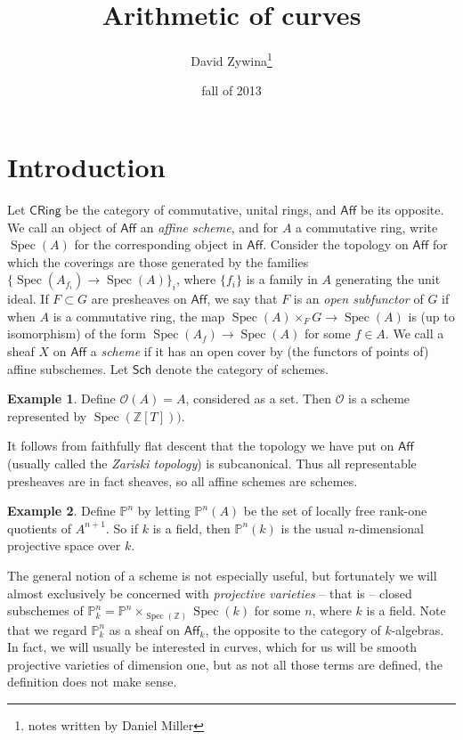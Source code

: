 \documentclass{article}
\title{Arithmetic of curves}
\author{David Zywina\thanks{notes written by Daniel Miller}}
\date{fall of 2013}
\DeclareMathOperator{\spec}{Spec}
\theoremstyle{definition}
\newtheorem{example}{Example}
\begin{document}
\maketitle










\section{Introduction}





Let $\mathsf{CRing}$ be the category of commutative, unital rings, and 
$\mathsf{Aff}$ be its opposite. We call an object of $\mathsf{Aff}$ an 
\emph{affine scheme}, and for $A$ a commutative ring, write $\spec(A)$ for the 
corresponding object in $\mathsf{Aff}$. Consider the topology on 
$\mathsf{Aff}$ for which the coverings are those generated by the families 
$\{\spec(A_{f_i})\to \spec(A)\}_i$, where $\{f_i\}$ is a family in $A$ 
generating the unit ideal. If $F\subset G$ are presheaves on $\mathsf{Aff}$, 
we say that $F$ is an \emph{open subfunctor} of $G$ if when $A$ is a 
commutative ring, the map $\spec(A)\times_F G\to \spec(A)$ is (up to 
isomorphism) of the form $\spec(A_f)\to \spec(A)$ for some $f\in A$. We call 
a sheaf $X$ on $\mathsf{Aff}$ a \emph{scheme} if it has an open cover by 
(the functors of points of) affine subschemes. Let $\mathsf{Sch}$ denote 
the category of schemes. 

\begin{example}
Define $\mathcal{O}(A)=A$, considered as a set. Then $\mathcal{O}$ is a scheme 
represented by $\spec(\mathbb{Z}[T]))$. 
\end{example}

It follows from faithfully flat descent that the topology we have put on 
$\mathsf{Aff}$ (usually called the \emph{Zariski topology}) is subcanonical. 
Thus all representable presheaves are in fact sheaves, so all affine schemes 
are schemes. 

\begin{example}
Define $\mathbb{P}^n$ by letting $\mathbb{P}^n(A)$ be the set of locally 
free rank-one quotients of $A^{n+1}$. So if $k$ is a field, then 
$\mathbb{P}^n(k)$ is the usual $n$-dimensional projective space over $k$. 
\end{example}

The general notion of a scheme is not especially useful, but fortunately we 
will almost exclusively be concerned with \emph{projective varieties} -- that 
is -- closed subschemes of 
$\mathbb{P}_k^n=\mathbb{P}^n\times_{\spec(\mathbb{Z})}\spec(k)$ for some $n$, 
where $k$ is a field. Note that we regard $\mathbb{P}_k^n$ as a sheaf on 
$\mathsf{Aff}_k$, the opposite to the category of $k$-algebras. In fact, we 
will usually be interested in curves, which for us will be smooth projective 
varieties of dimension one, but as not all those terms are defined, the 
definition does not make sense. 
\end{document}
